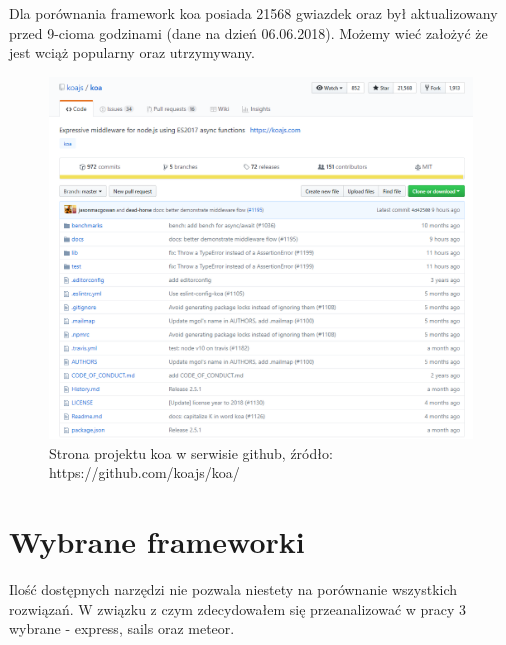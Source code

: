 \documentclass[12pt]{report}
\begin{document}
    Dla porównania framework koa posiada 21568 gwiazdek oraz był aktualizowany przed 9-cioma godzinami (dane na dzień 06.06.2018).
    Możemy wieć założyć że jest wciąż popularny oraz utrzymywany.
    \begin{figure}[!hb]
      \centering
      \includegraphics[width=\textwidth,height=\textheight,keepaspectratio]{koa.png} 
      \caption{Strona projektu koa w serwisie github, źródło: https://github.com/koajs/koa/}
    \end{figure}

  \section{Wybrane frameworki}
    Ilość dostępnych narzędzi nie pozwala niestety na porównanie wszystkich rozwiązań.
    W związku z czym zdecydowałem się przeanalizować w pracy 3 wybrane - express, sails oraz meteor.
\end{document}
